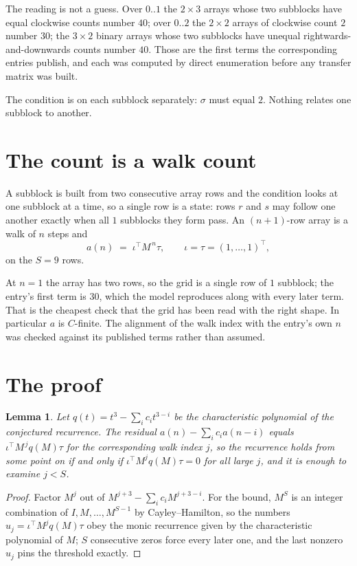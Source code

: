 \documentclass[11pt,a4paper]{article}
\theoremstyle{plain}
\newtheorem{lemma}[theorem]{Lemma}
\theoremstyle{definition}
\begin{document}
The reading is not a guess. Over $0..1$ the $2\times3$ arrays whose two subblocks have equal
clockwise counts number $40$; over $0..2$ the $2\times2$ arrays of clockwise count $2$ number
$30$; the $3\times2$ binary arrays whose two subblocks have unequal rightwards-and-downwards
counts number $40$. Those are the first terms the corresponding entries publish, and each was
computed by direct enumeration before any transfer matrix was built.

The condition is on each subblock separately: $\sigma$ must equal $2$. Nothing
relates one subblock to another.

\section{The count is a walk count}

A subblock is built from two consecutive array rows and the condition looks
at one subblock at a time, so a single row is a state: rows $r$ and $s$ may follow one another
exactly when all $1$ subblocks they form pass. An $(n+1)$-row array is a walk of $n$ steps and
\[
a(n)\;=\;\iota^{\!\top}M^{\,n}\tau,\qquad\iota=\tau=(1,\dots,1)^{\!\top},
\]
on the $S=9$ rows.

At $n=1$ the array has two rows, so the grid is a single row of $1$
subblock; the entry's first term is $30$, which the model
reproduces along with every later term. That is the cheapest check that the grid has been read
with the right shape.
In particular $a$ is $C$-finite. The alignment of the walk index with the entry's own $n$ was
checked against its published terms rather than assumed.

\section{The proof}

\begin{lemma}\label{lem:crit}
Let $q(t)=t^{3}-\sum_i c_it^{3-i}$ be the characteristic polynomial of the
conjectured recurrence. The residual $a(n)-\sum_ic_ia(n-i)$ equals
$\iota^{\!\top}M^{\,j}q(M)\tau$ for the corresponding walk index $j$, so the recurrence
holds from some point on if and only if $\iota^{\!\top}M^{j}q(M)\tau=0$ for all large $j$,
and it is enough to examine $j<S$.
\end{lemma}

\begin{proof}
Factor $M^{j}$ out of $M^{j+3}-\sum_ic_iM^{j+3-i}$. For the bound, $M^{S}$
is an integer combination of $I,M,\dots,M^{S-1}$ by Cayley--Hamilton, so the numbers
$u_j=\iota^{\!\top}M^{j}q(M)\tau$ obey the monic recurrence given by the characteristic
polynomial of $M$; $S$ consecutive zeros force every later one, and the last nonzero $u_j$
pins the threshold exactly.
\end{proof}
\end{document}
